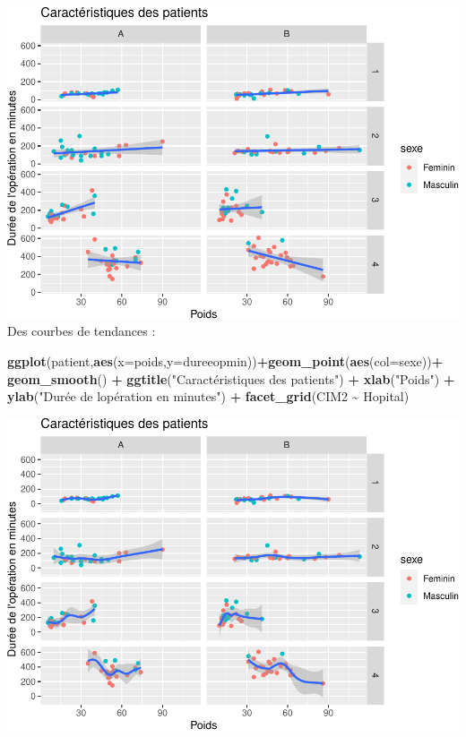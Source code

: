 \documentclass[
]{book}
\newenvironment{Shaded}{\begin{snugshade}}{\end{snugshade}}
\newcommand{\AttributeTok}[1]{\textcolor[rgb]{0.13,0.29,0.53}{#1}}
\newcommand{\FunctionTok}[1]{\textcolor[rgb]{0.13,0.29,0.53}{\textbf{#1}}}
\newcommand{\NormalTok}[1]{#1}
\newcommand{\SpecialCharTok}[1]{\textcolor[rgb]{0.81,0.36,0.00}{\textbf{#1}}}
\newcommand{\StringTok}[1]{\textcolor[rgb]{0.31,0.60,0.02}{#1}}
\begin{document}
\includegraphics{_main_files/figure-latex/ggplot17a-1.pdf}
Des courbes de tendances :

\begin{Shaded}
\begin{Highlighting}[]
\FunctionTok{ggplot}\NormalTok{(patient,}\FunctionTok{aes}\NormalTok{(}\AttributeTok{x=}\NormalTok{poids,}\AttributeTok{y=}\NormalTok{dureeopmin))}\SpecialCharTok{+}\FunctionTok{geom\_point}\NormalTok{(}\FunctionTok{aes}\NormalTok{(}\AttributeTok{col=}\NormalTok{sexe))}\SpecialCharTok{+}
  \FunctionTok{geom\_smooth}\NormalTok{() }\SpecialCharTok{+}
  \FunctionTok{ggtitle}\NormalTok{(}\StringTok{"Caractéristiques des patients"}\NormalTok{) }\SpecialCharTok{+} 
  \FunctionTok{xlab}\NormalTok{(}\StringTok{"Poids"}\NormalTok{) }\SpecialCharTok{+} 
  \FunctionTok{ylab}\NormalTok{(}\StringTok{"Durée de l\textquotesingle{}opération en minutes"}\NormalTok{) }\SpecialCharTok{+}
  \FunctionTok{facet\_grid}\NormalTok{(CIM2 }\SpecialCharTok{\textasciitilde{}}\NormalTok{ Hopital)}
\end{Highlighting}
\end{Shaded}

\includegraphics{_main_files/figure-latex/ggplot18-1.pdf}
\end{document}
